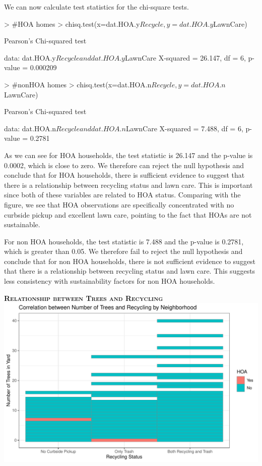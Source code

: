 \documentclass{article}
\begin{document}
We can now calculate test statistics for the chi-square tests. 
\begin{Schunk}
\begin{Sinput}
> #HOA homes
> chisq.test(x=dat.HOA.y$Recycle,y=dat.HOA.y$LawnCare)
\end{Sinput}
\begin{Soutput}
	Pearson's Chi-squared test

data:  dat.HOA.y$Recycle and dat.HOA.y$LawnCare
X-squared = 26.147, df = 6, p-value = 0.000209
\end{Soutput}
\begin{Sinput}
> #nonHOA homes
> chisq.test(x=dat.HOA.n$Recycle,y=dat.HOA.n$LawnCare)
\end{Sinput}
\begin{Soutput}
	Pearson's Chi-squared test

data:  dat.HOA.n$Recycle and dat.HOA.n$LawnCare
X-squared = 7.488, df = 6, p-value = 0.2781
\end{Soutput}
\end{Schunk}

As we can see for HOA households, the test statistic is 26.147 and the p-value is 0.0002, which is close to zero. We therefore can reject the null hypothesis and conclude that for HOA households, there is sufficient evidence to suggest that there is a relationship between recycling status and lawn care. This is important since both of these variables are related to HOA status. Comparing with the figure, we see that HOA observations are specifically concentrated with no curbside pickup and excellent lawn care, pointing to the fact that HOAs are not sustainable.

For non HOA households, the test statistic is 7.488 and the p-value is 0.2781, which is greater than 0.05. We therefore fail to reject the null hypothesis and conclude that for non HOA households, there is not sufficient evidence to suggest that there is a relationship between recycling status and lawn care. This suggests less consistency with sustainability factors for non HOA households.

\newpage
\textsc{\textbf{Relationship between Trees and Recycling}}
\newline
\newline
\includegraphics{exam22-030}
\end{document}
